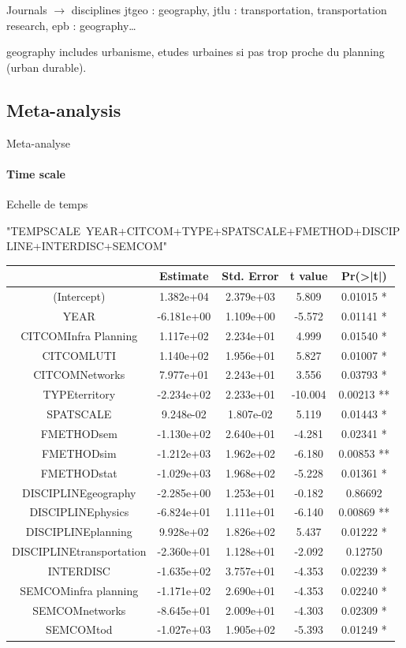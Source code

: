 Journals $\rightarrow$ disciplines
jtgeo : geography, jtlu : transportation, transportation research, epb : geography\ldots

geography includes urbanisme, etudes urbaines si pas trop proche du planning (urban durable).







\subsection{Meta-analysis}{Meta-analyse}

\paragraph{Time scale}{Echelle de temps}

"TEMPSCALE~YEAR+CITCOM+TYPE+SPATSCALE+FMETHOD+DISCIPLINE+INTERDISC+SEMCOM"

\begin{tabular}{|c|c|c|c|c|}
\hline
 &     Estimate & Std. Error & t value & Pr(>|t|)   \\\hline
(Intercept)           &    1.382e+04 &  2.379e+03 &  5.809 & 0.01015 * \\
YEAR                   &  -6.181e+00 &  1.109e+00 & -5.572 & 0.01141 * \\
CITCOMInfra Planning   &   1.117e+02 &  2.234e+01 &  4.999 & 0.01540 * \\
CITCOMLUTI             &   1.140e+02 & 1.956e+01  & 5.827 & 0.01007 * \\
CITCOMNetworks         &   7.977e+01 & 2.243e+01 &  3.556 & 0.03793 * \\
TYPEterritory          &  -2.234e+02 & 2.233e+01 & -10.004 & 0.00213 ** \\
SPATSCALE              &   9.248e-02 & 1.807e-02 &  5.119 & 0.01443 * \\
FMETHODsem             &  -1.130e+02 & 2.640e+01 &  -4.281 & 0.02341 * \\
FMETHODsim             &  -1.212e+03 & 1.962e+02 & -6.180 & 0.00853 **\\
FMETHODstat            &  -1.029e+03 & 1.968e+02 & -5.228 & 0.01361 * \\
DISCIPLINEgeography    &  -2.285e+00 & 1.253e+01 & -0.182 & 0.86692   \\
DISCIPLINEphysics      &  -6.824e+01 & 1.111e+01 & -6.140 & 0.00869 **\\
DISCIPLINEplanning     &   9.928e+02 & 1.826e+02  & 5.437 & 0.01222 * \\
DISCIPLINEtransportation & -2.360e+01 & 1.128e+01 & -2.092 & 0.12750   \\
INTERDISC             &   -1.635e+02 & 3.757e+01 & -4.353 & 0.02239 * \\
SEMCOMinfra planning  &   -1.171e+02 & 2.690e+01 & -4.353 & 0.02240 * \\
SEMCOMnetworks        &   -8.645e+01 & 2.009e+01 & -4.303 & 0.02309 * \\
SEMCOMtod             &   -1.027e+03 & 1.905e+02 & -5.393 & 0.01249 * \\\hline
\end{tabular}

